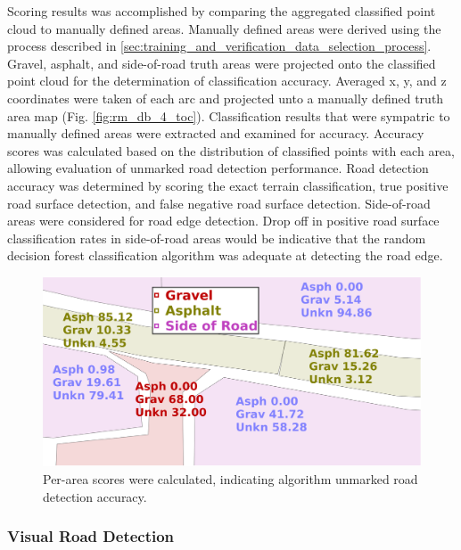 \documentclass[numbered,pdftex]{ohio-etd}
\begin{document}
{{{{{				{Scoring results was accomplished by comparing the aggregated classified point cloud to manually defined areas. Manually defined areas were derived using the process described in \ref{sec:training_and_verification_data_selection_process}. Gravel, asphalt, and side-of-road truth areas were projected onto the classified point cloud for the determination of classification accuracy. Averaged x, y, and z coordinates were taken of each arc and projected unto a manually defined truth area map (Fig. \ref{fig:rm_db_4_toc}). Classification results that were sympatric to manually defined areas were extracted and examined for accuracy. Accuracy scores was calculated based on the distribution of classified points with each area, allowing evaluation of unmarked road detection performance. Road detection accuracy was determined by scoring the exact terrain classification, true positive road surface detection, and false negative road surface detection. Side-of-road areas were considered for road edge detection. Drop off in positive road surface classification rates in side-of-road areas would be indicative that the random decision forest classification algorithm was adequate at detecting the road edge.}
				
				
				
				
				\begin{figure}[H]
					\centering
					\includegraphics[width=0.75\linewidth]{Defense_Images/area_score_example}
					\caption[Area Scores]{Per-area scores were calculated, indicating algorithm unmarked road detection accuracy. }
					\label{fig:prepostadjust}
				\end{figure}
				
				
				
			}
		
			\subsubsection{Visual Road Detection}\label{sec:manual_road_detection}{
			
}}}}}
\end{document}
